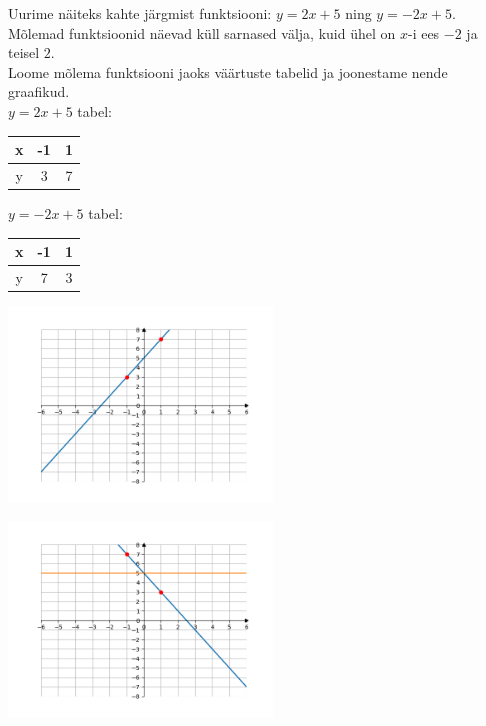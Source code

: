 \begin{center}
{{{\begin{flushleft}
\vspace{2mm}
\hspace{5mm}
Uurime näiteks kahte järgmist funktsiooni: $y=2x+5$ ning $y=-2x+5$.\\
\hspace{5mm}
Mõlemad funktsioonid näevad küll sarnased välja, kuid ühel on $x$-i ees $-2$ ja teisel $2$.\\
\hspace{5mm} Loome mõlema funktsiooni jaoks väärtuste tabelid ja joonestame nende graafikud.\\
\vspace{5mm}
\hspace{15mm} $y=2x+5$ tabel:\hspace{3mm}
\begin{tabular}{c|c|c}
     x & -1 & 1  \\
     \hline
     y & 3 & 7
\end{tabular}
\hspace{25mm} $y=-2x+5$ tabel: \hspace{3mm}
\begin{tabular}{c|c|c}
     x & -1 & 1\\
     \hline
     y & 7 & 3
\end{tabular}
\begin{center}
\begin{minipage}{7cm}
  \includegraphics[width=7cm]{y=2x+5.png}
  \label{img3}
\end{minipage}
\hspace{.05\linewidth}
\begin{minipage}{.45\linewidth}
  \includegraphics[width=7cm]{y=-2x+5.png}
  \label{img4}
\end{minipage}
\end{center}


\end{flushleft}}}}
\end{center}
